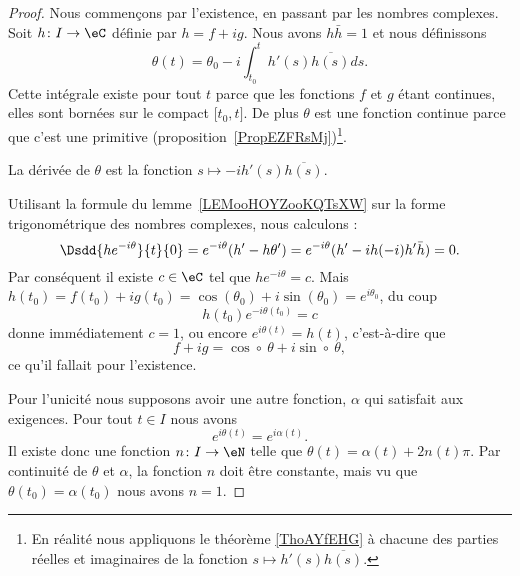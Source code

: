 	\begin{proof}
		Nous commençons par l'existence, en passant par les nombres complexes. Soit \( h\colon I\to \eC\) définie par \( h=f+ig\). Nous avons \( h\bar h=1\) et nous définissons
		\begin{equation}
			\theta(t)=\theta_0-i\int_{t_0}^th'(s)\overline{ h(s) }ds.
		\end{equation}
		Cette intégrale existe pour tout \( t\) parce que les fonctions \( f\) et \( g\) étant continues, elles sont bornées sur le compact \( \mathopen[ t_0 , t  \mathclose]\). De plus \( \theta\) est une fonction continue parce que c'est une primitive (proposition~\ref{PropEZFRsMj})\footnote{En réalité nous appliquons le théorème \ref{ThoAYfEHG} à chacune des parties réelles et imaginaires de la fonction \( s\mapsto h'(s)\overline{ h(s) }\).}.

		La dérivée de \( \theta\) est la fonction \( s\mapsto -i h'(s)\overline{ h(s) }\).

		Utilisant la formule du lemme~\ref{LEMooHOYZooKQTsXW} sur la forme trigonométrique des nombres complexes, nous calculons :
		\begin{equation}
			\Dsdd{ h e^{-i\theta} }{t}{0}= e^{-i\theta}(h'-h\theta')= e^{-i\theta}(h'-ih(-i)h'\bar h)=0.
		\end{equation}
		Par conséquent il existe \( c\in \eC\) tel que \( h e^{-i\theta}=c\). Mais \( h(t_0)=f(t_0)+ig(t_0)=\cos(\theta_0)+i\sin(\theta_0)= e^{i\theta_0}\), du coup
		\begin{equation}
			h(t_0) e^{-i\theta(t_0)}=c
		\end{equation}
		donne immédiatement \( c=1\), ou encore \(  e^{i\theta(t)}=h(t)\), c'est-à-dire que
		\begin{equation}
			f+ig=\cos\circ\ \theta+i\sin\circ\ \theta,
		\end{equation}
		ce qu'il fallait pour l'existence.

		Pour l'unicité nous supposons avoir une autre fonction, \(\alpha\) qui satisfait aux exigences. Pour tout \( t\in I\) nous avons
		\begin{equation}
			e^{i\theta(t)}= e^{i\alpha(t)}.
		\end{equation}
		Il existe donc une fonction \( n\colon I\to \eN\) telle que \( \theta(t)=\alpha(t)+2n(t)\pi\). Par continuité de \( \theta\) et \( \alpha\), la fonction \( n\) doit être constante, mais vu que \( \theta(t_0)=\alpha(t_0)\) nous avons \( n=1\).
	\end{proof}



